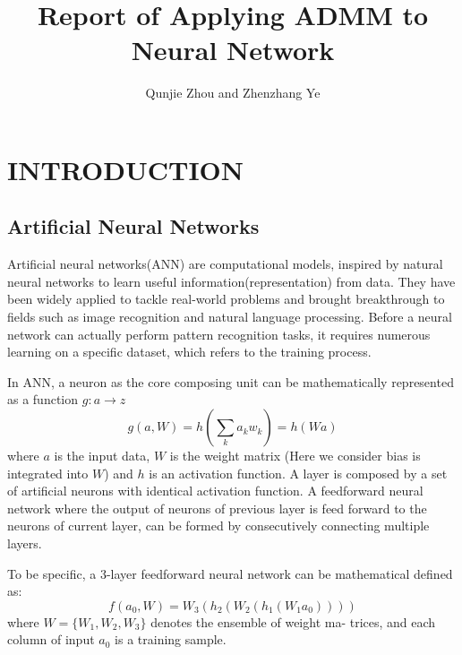 \documentclass[letterpaper, 10 pt, conference]{ieeeconf}  %
\title{\LARGE \bf
Report of Applying ADMM to Neural Network
}
\author{Qunjie Zhou and Zhenzhang Ye%
}
\begin{document}
\maketitle
\thispagestyle{empty}
\pagestyle{empty}

\section{INTRODUCTION}
\subsection{Artificial Neural Networks} 
Artificial neural networks(ANN) are computational models, inspired by natural neural networks to learn useful information(representation) from data. They have been widely applied to tackle real-world problems and brought breakthrough to fields such as image recognition and natural language processing.  Before a neural network can actually perform pattern recognition tasks, it requires numerous learning on a specific dataset, which refers to the training process.
 
 In ANN, a neuron as the core composing unit can be mathematically represented as a function $g: a \rightarrow z$
 \begin{equation}
	g(a, W)= h(\displaystyle\sum_{k}a_kw_k) = h(Wa)
\end{equation}
where $a$ is the input data, $W$ is the weight matrix (Here we consider bias is integrated into $W$) and $h$ is an activation function\cite{1}. A layer is composed by a set of artificial neurons with identical activation function. A feedforward neural network where the output of neurons of previous layer is feed forward to the neurons of current layer, can be formed by consecutively connecting multiple layers.

To be specific, a 3-layer feedforward neural network can be mathematical defined as:
\begin{equation} \label{eq:network}
	f(a_0, W) = W_3(h_2(W_2(h_1(W_1a_0))))
\end{equation}
where $W = \{W_1, W_2, W_3\}$ denotes the ensemble of weight ma- trices, and each column of input $a_0$ is a training sample.
\end{document}

